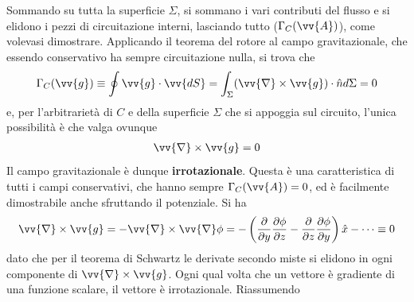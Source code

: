 \documentclass[a4paper, oneside]{book}
\begin{document}
Sommando su tutta la superficie $\Sigma$, si sommano i vari contributi del flusso e si elidono i 
pezzi di circuitazione interni, lasciando tutto ($\Gamma_C(\vv{A} )$), come volevasi dimostrare.
Applicando il teorema del rotore al campo gravitazionale, che essendo conservativo ha sempre circuitazione nulla, 
si trova che
\begin{gather*}
    \Gamma_C(\vv{g} ) \equiv \oint \vv{g} \cdot \vv{dS} = \int_{\Sigma} (\vv{\nabla} \times \vv{g}  ) \cdot \hat{n} d\Sigma = 0    
\end{gather*}
e, per l'arbitrarietà di $C$ e della superficie $\Sigma$ che si appoggia sul circuito,
l'unica possibilità è che valga ovunque 
\begin{align}
    \vv{\nabla}\times \vv{g} = 0  
\end{align}
Il campo gravitazionale è dunque \textbf{irrotazionale}. Questa 
è una caratteristica di tutti i campi conservativi, che hanno sempre 
$\Gamma_C(\vv{A} ) = 0$, ed è facilmente dimostrabile anche sfruttando il potenziale. Si ha
\begin{gather*}
    \vv{\nabla} \times \vv{g} = -\vv{\nabla} \times \vv{\nabla}\phi = -\left(\frac{\partial }{\partial y} \frac{\partial \phi}{\partial z} - \frac{\partial }{\partial z} \frac{\partial \phi}{\partial y}   \right) \hat{x} - \dots \equiv 0    
\end{gather*}
dato che per il teorema di Schwartz le derivate secondo miste si 
elidono in ogni componente di $\vv{\nabla} \times \vv{g}$. Ogni qual volta 
che un vettore è gradiente di una funzione scalare, il vettore è irrotazionale.
Riassumendo \\ \\

\clearpage
\end{document}
